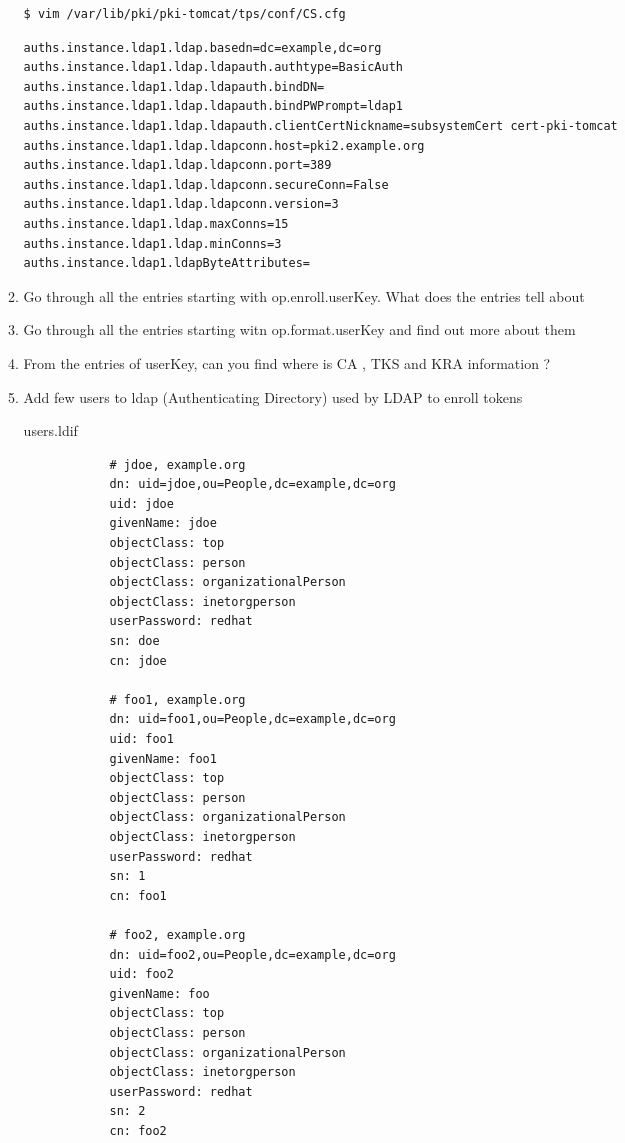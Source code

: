 \documentclass[12pt]{report}
\begin{document}
\begin{enumerate}[label*=\arabic*.]
\begin{enumerate}[label*=\arabic*.]
\begin{lstlisting}[style=bashInputStyle]
$ vim /var/lib/pki/pki-tomcat/tps/conf/CS.cfg
                    \end{lstlisting}
                    \begin{lstlisting}
auths.instance.ldap1.ldap.basedn=dc=example,dc=org
auths.instance.ldap1.ldap.ldapauth.authtype=BasicAuth
auths.instance.ldap1.ldap.ldapauth.bindDN=
auths.instance.ldap1.ldap.ldapauth.bindPWPrompt=ldap1
auths.instance.ldap1.ldap.ldapauth.clientCertNickname=subsystemCert cert-pki-tomcat
auths.instance.ldap1.ldap.ldapconn.host=pki2.example.org
auths.instance.ldap1.ldap.ldapconn.port=389
auths.instance.ldap1.ldap.ldapconn.secureConn=False
auths.instance.ldap1.ldap.ldapconn.version=3
auths.instance.ldap1.ldap.maxConns=15
auths.instance.ldap1.ldap.minConns=3
auths.instance.ldap1.ldapByteAttributes=
                    \end{lstlisting}

            \item Go through all the entries starting with op.enroll.userKey. What does the entries tell about 
            \item Go through all the entries starting witn op.format.userKey and find out more about them
            \item From the entries of userKey, can you find where is CA , TKS and KRA information ?
            \item \label{token_ex1} Add few users to ldap (Authenticating Directory) used by LDAP to enroll tokens
                
            users.ldif
            \begin{lstlisting}
            # jdoe, example.org
            dn: uid=jdoe,ou=People,dc=example,dc=org
            uid: jdoe
            givenName: jdoe
            objectClass: top
            objectClass: person
            objectClass: organizationalPerson
            objectClass: inetorgperson
            userPassword: redhat
            sn: doe
            cn: jdoe

            # foo1, example.org
            dn: uid=foo1,ou=People,dc=example,dc=org
            uid: foo1
            givenName: foo1
            objectClass: top
            objectClass: person
            objectClass: organizationalPerson
            objectClass: inetorgperson
            userPassword: redhat
            sn: 1
            cn: foo1

            # foo2, example.org
            dn: uid=foo2,ou=People,dc=example,dc=org
            uid: foo2
            givenName: foo
            objectClass: top
            objectClass: person
            objectClass: organizationalPerson
            objectClass: inetorgperson
            userPassword: redhat
            sn: 2
            cn: foo2


\end{lstlisting}
\end{enumerate}
\end{enumerate}
\end{document}
